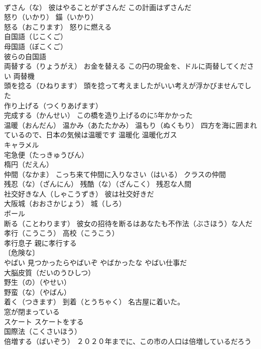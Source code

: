 \documentclass[8pt]{extreport}
\begin{document}
\begin{CJK}{UTF8}{min}
\\	ずさん（な） 彼はやることがずさんだ この計画はずさんだ
\\	怒り（いかり） 錨（いかり）
\\	怒る（おこります） 怒りに燃える
\\	自国語（じこくご）
\\	母国語（ぼこくご）
\\	彼らの自国語
\\	両替する（りょうがえ） お金を替える この円の現金を、ドルに両替してください 両替機
\\	頭を捻る（ひねります） 頭を捻って考えましたがいい考えが浮かびませんでした
\\	作り上げる（つくりあげます） 
\\	完成する（かんせい） この橋を造り上げるのに5年かかった
\\	温暖（おんだん） 温かみ（あたたかみ） 温もり（ぬくもり） 四方を海に囲まれているので、日本の気候は温暖です 温暖化 温暖化ガス
\\	キャラメル
\\	宅急便（たっきゅうびん）
\\	楕円（だえん）
\\	仲間（なかま） こっち来て仲間に入りなさい（はいる） クラスの仲間
\\	残忍（な）（ざんにん） 残酷（な）（ざんこく） 残忍な人間
\\	社交好きな人（しゃこうずき） 彼は社交好きだ
\\	大阪城（おおさかじょう） 城（しろ）
\\	ボール
\\	断る（ことわります） 彼女の招待を断るはあなたも不作法（ぶさほう）な人だ
\\	孝行（こうこう） 高校（こうこう）
\\	孝行息子 親に孝行する
\\	〔危険な〕
\\	やばい 見つかったらやばいぞ やばかったな やばい仕事だ
\\	大脳皮質（だいのうひしつ）
\\	野生（の）（やせい）
\\	野蛮（な）（やばん）
\\	着く（つきます） 到着（とうちゃく） 名古屋に着いた。
\\	窓が閉まっている
\\	スケート スケートをする
\\	国際法（こくさいほう）
\\	倍増する（ばいぞう） ２０２０年までに、この市の人口は倍増しているだろう

\end{CJK}
\end{document}
